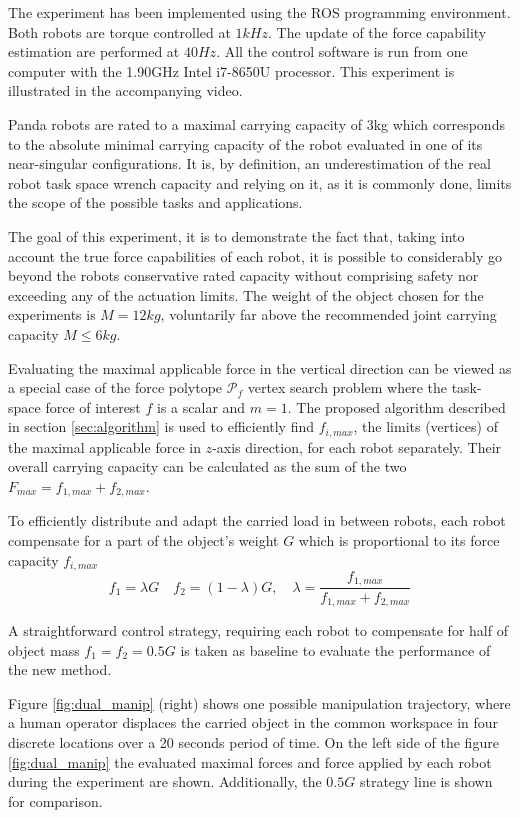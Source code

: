 The experiment has been implemented using the ROS programming environment. Both robots are torque controlled at $1 kHz$. The update of the force capability estimation are performed at $40 Hz$. All the control software is run from one computer with the 1.90GHz Intel i7-8650U processor. This experiment is illustrated in the accompanying video.

Panda robots are rated to a maximal carrying capacity of 3kg which corresponds to the absolute minimal carrying capacity of the robot evaluated in one of its near-singular configurations. It is, by definition, an underestimation of the real robot task space wrench capacity and relying on it, as it is commonly done, limits the scope of the possible tasks and applications.

The goal of this experiment, it is to demonstrate the fact that, taking into account the true force capabilities of each robot, it is possible to considerably go beyond the robots conservative rated capacity without comprising safety nor exceeding any of the actuation limits. The weight of the object chosen for the experiments is $M=12kg$, voluntarily far above the recommended joint carrying capacity $M \le 6kg$. 

Evaluating the maximal applicable force in the vertical direction can be viewed as a special case of the force polytope $\mathcal{P}_f$ vertex search problem where the task-space force of interest $f$ is a scalar and $m=1$.
The proposed algorithm described in section \ref{sec:algorithm} is used to efficiently find $f_{i,max}$, the limits (vertices) of the maximal applicable force in $z$-axis direction, for each robot separately.  Their overall carrying capacity can be calculated as the sum of the two $F_{max} = f_{1,max} + f_{2,max}$.

To efficiently distribute and adapt the carried load in between robots, each robot compensate for a part of the object's weight $G$ which is proportional to its force capacity  $f_{i,max}$  
\begin{equation}
   f_1 = \lambda G \quad f_2 = (1-\lambda)G,\quad \lambda = \frac{f_{1,max}}{f_{1,max} + f_{2,max}}
\end{equation}

A straightforward control strategy, requiring each robot to compensate for half of object mass $f_1=f_2=0.5G$ is taken as baseline to evaluate the performance of the new method.

Figure \ref{fig:dual_manip} (right) shows one possible manipulation trajectory, where a human operator displaces the carried object in the common workspace in four discrete locations over a 20 seconds period of time. On the left side of the figure \ref{fig:dual_manip} the evaluated maximal forces and force applied by each robot during the experiment are shown. Additionally, the $0.5G$ strategy line is shown for comparison. 

